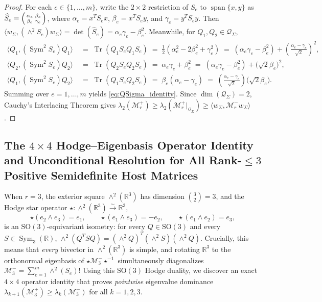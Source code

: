\documentclass[11pt,a4paper]{article}
\theoremstyle{plain}
\theoremstyle{definition}
\theoremstyle{remark}
\DeclareMathOperator{\Tr}{Tr}
\DeclareMathOperator{\Sym}{Sym}
\begin{document}
\begin{proof}
For each $e \in \{1,\dots,m\}$, write the $2 \times 2$ restriction of $S_e$ to $\operatorname{span}\{x,y\}$ as $\widehat{S}_e = \begin{psmallmatrix} \alpha_e & \beta_e \\ \beta_e & \gamma_e \end{psmallmatrix}$, where $\alpha_e = x^T S_e x$, $\beta_e = x^T S_e y$, and $\gamma_e = y^T S_e y$. Then $\langle w_\Sigma, (\wedge^2 S_e) w_\Sigma \rangle = \det(\widehat{S}_e) = \alpha_e\gamma_e - \beta_e^2$. Meanwhile, for $Q_1, Q_2 \in \mathcal{Q}_\Sigma$,
\begin{align*}
  \langle Q_1, (\Sym^2 S_e) Q_1 \rangle &\;=\; \Tr(Q_1 S_e Q_1 S_e) \;=\; \frac{1}{2}(\alpha_e^2 - 2\beta_e^2 + \gamma_e^2) \;=\; (\alpha_e\gamma_e - \beta_e^2) + \left(\frac{\alpha_e - \gamma_e}{\sqrt{2}}\right)^2, \\
  \langle Q_2, (\Sym^2 S_e) Q_2 \rangle &\;=\; \Tr(Q_2 S_e Q_2 S_e) \;=\; \alpha_e\gamma_e + \beta_e^2 \;=\; (\alpha_e\gamma_e - \beta_e^2) + \big(\sqrt{2}\beta_e\big)^2, \\
  \langle Q_1, (\Sym^2 S_e) Q_2 \rangle &\;=\; \Tr(Q_1 S_e Q_2 S_e) \;=\; \beta_e(\alpha_e - \gamma_e) \;=\; \left(\frac{\alpha_e - \gamma_e}{\sqrt{2}}\right)\big(\sqrt{2}\beta_e\big).
\end{align*}
Summing over $e = 1,\dots,m$ yields \eqref{eq:QSigma_identity}. Since $\dim(\mathcal{Q}_\Sigma) = 2$, Cauchy's Interlacing Theorem gives $\lambda_2(\mathcal{M}_r^+) \ge \lambda_2(\mathcal{M}_r^+|_{\mathcal{Q}_\Sigma}) \ge \langle w_\Sigma, \mathcal{M}_r^- w_\Sigma \rangle$.
\end{proof}

\subsection{The \texorpdfstring{$4 \times 4$}{4x4} Hodge--Eigenbasis Operator Identity and Unconditional Resolution for All Rank-\texorpdfstring{$\le 3$}{<= 3} Positive Semidefinite Host Matrices}

When $r = 3$, the exterior square $\wedge^2(\mathbb{R}^3)$ has dimension $\binom{3}{2} = 3$, and the Hodge star operator $\star : \wedge^2(\mathbb{R}^3) \xrightarrow{\sim} \mathbb{R}^3$,
\[
  \star(e_2 \wedge e_3) = e_1, \qquad \star(e_1 \wedge e_3) = -e_2, \qquad \star(e_1 \wedge e_2) = e_3,
\]
is an $\mathrm{SO}(3)$-equivariant isometry: for every $Q \in \mathrm{SO}(3)$ and every $S \in \Sym_3(\mathbb{R})$, $\wedge^2(Q^T S Q) = (\wedge^2 Q)^T (\wedge^2 S)(\wedge^2 Q)$. Crucially, this means that \emph{every} bivector in $\wedge^2(\mathbb{R}^3)$ is simple, and rotating $\mathbb{R}^3$ to the orthonormal eigenbasis of $\star \mathcal{M}_3^- \star^{-1}$ simultaneously diagonalizes $\mathcal{M}_3^- = \sum_{e=1}^m \wedge^2(S_e)$! Using this $\mathrm{SO}(3)$ Hodge duality, we discover an exact $4 \times 4$ operator identity that proves \emph{pointwise} eigenvalue dominance $\lambda_{k+1}(\mathcal{M}_3^+) \ge \lambda_k(\mathcal{M}_3^-)$ for all $k = 1, 2, 3$.
\end{document}
